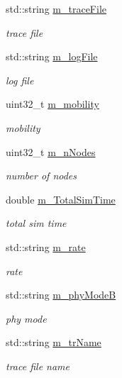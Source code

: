 \begin{DoxyCompactItemize}
std\+::string \hyperlink{classVanetRoutingExperiment_a71d4ca6c5a1d376e7313ffa30418622e}{m\+\_\+trace\+File}
\begin{DoxyCompactList}\small\item\em trace file \end{DoxyCompactList}\item 
std\+::string \hyperlink{classVanetRoutingExperiment_a044a4788705e412d45aa057bef38e8c3}{m\+\_\+log\+File}
\begin{DoxyCompactList}\small\item\em log file \end{DoxyCompactList}\item 
uint32\+\_\+t \hyperlink{classVanetRoutingExperiment_a1ab9e6d4a9fcfabb7b6fd820a39f63e3}{m\+\_\+mobility}
\begin{DoxyCompactList}\small\item\em mobility \end{DoxyCompactList}\item 
uint32\+\_\+t \hyperlink{classVanetRoutingExperiment_ac2bf996dc9fe3163f8a720acbf4f6f85}{m\+\_\+n\+Nodes}
\begin{DoxyCompactList}\small\item\em number of nodes \end{DoxyCompactList}\item 
double \hyperlink{classVanetRoutingExperiment_acae630bc30645931dcb68283b0217b1b}{m\+\_\+\+Total\+Sim\+Time}
\begin{DoxyCompactList}\small\item\em total sim time \end{DoxyCompactList}\item 
std\+::string \hyperlink{classVanetRoutingExperiment_af340a9b4538cab1e93a0fcfaf9b6e8d9}{m\+\_\+rate}
\begin{DoxyCompactList}\small\item\em rate \end{DoxyCompactList}\item 
std\+::string \hyperlink{classVanetRoutingExperiment_a82dffa1e0b2ddfd1d9afd33e35d33dfb}{m\+\_\+phy\+ModeB}
\begin{DoxyCompactList}\small\item\em phy mode \end{DoxyCompactList}\item 
std\+::string \hyperlink{classVanetRoutingExperiment_a0466c1a95224670184e95070078f593a}{m\+\_\+tr\+Name}
\begin{DoxyCompactList}\small\item\em trace file name \end{DoxyCompactList}\item 

\end{DoxyCompactItemize}
